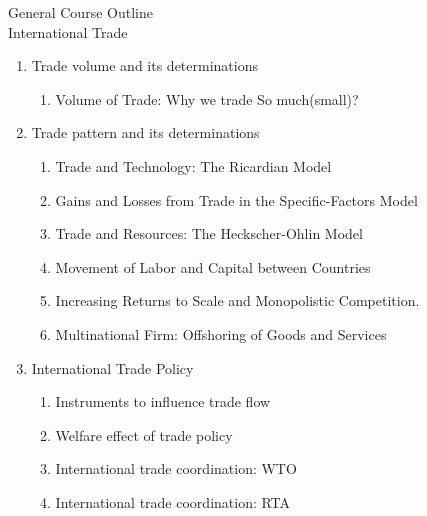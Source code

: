 \documentclass[10pt,hyperref={CJKbookmarks=true},xcolor=dvipsnames,aspectratio=43]{beamer}
\begin{document}
\begin{frame}{General Course Outline\\International Trade}

\begin{enumerate}
\item Trade volume and its determinations
\begin{enumerate}
\item Volume of Trade: Why we trade So much(small)?	 	
\end{enumerate}
\item Trade pattern and its determinations
\begin{enumerate}
\item Trade and Technology: The Ricardian Model 
\item Gains and Losses from Trade in the Specific-Factors Model 
\item Trade and Resources: The Heckscher-Ohlin Model 
\item Movement of Labor and Capital between Countries 
\item Increasing Returns to Scale and Monopolistic Competition. 
\item Multinational Firm: Offshoring of Goods and Services 
\end{enumerate}
\item International Trade Policy
\begin{enumerate}
\item Instruments to influence trade flow
\item Welfare effect of trade policy
\item International trade coordination: WTO
\item International trade coordination: RTA
\end{enumerate}
\end{enumerate}
\end{frame}
\end{document}
